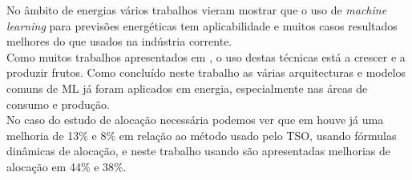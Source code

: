 No âmbito de energias vários trabalhos vieram mostrar que o uso de \textit{machine learning} para previsões energéticas tem aplicabilidade \cite{Stassen} e muitos casos resultados melhores do que usados na indústria corrente. \cite{Ahmad2020} \cite{Antonopoulos2020} \\  
Como muitos trabalhos apresentados em \cite{Benti2023}, o uso destas técnicas está a crescer e a produzir frutos. Como concluído neste trabalho as várias arquitecturas e modelos comuns de ML já foram aplicados em energia, especialmente nas áreas de consumo e produção. \\
No caso do estudo de alocação necessária podemos ver que em \cite{Algarvio2024} houve já uma melhoria de 13\% e 8\% em relação ao método usado pelo TSO, usando fórmulas dinâmicas de alocação, e neste trabalho usando  são apresentadas melhorias de alocação em 44\% e 38\%.\\






